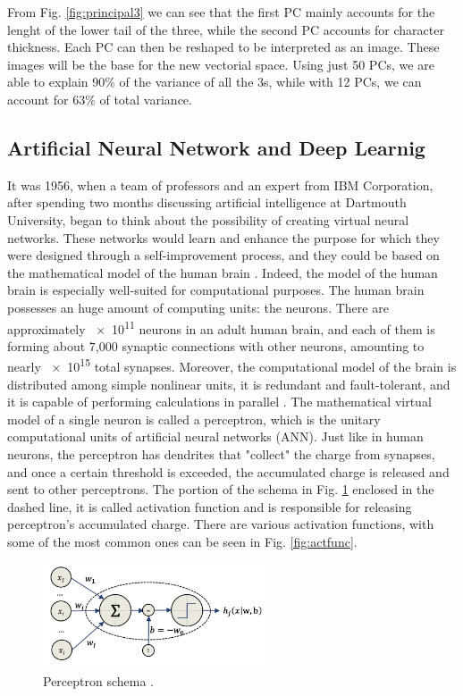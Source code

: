 From Fig. \ref{fig:principal3} we can see that the first PC mainly accounts for the lenght of the lower tail of the three, while the second PC accounts for character thickness. Each PC can then be reshaped to be interpreted as an image. These images will be the base for the new vectorial space. Using just 50 PCs, we are able to explain 90\% of the variance of all the 3s, while with 12 PCs, we can account for 63\% of total variance.



\subsection{Artificial Neural Network and Deep Learnig}
\label{subsec:deepl}
It was 1956, when a team of professors and an expert from IBM Corporation, after spending two months discussing artificial intelligence at Dartmouth University, began to think about the possibility of creating virtual neural networks. These networks would learn and enhance the purpose for which they were designed through a self-improvement process, and they could be based on the mathematical model of the human brain \cite{mccarthy_proposal_1955}. Indeed, the model of the human brain is especially well-suited for computational purposes. The human brain possesses an huge amount of computing units: the neurons. There are approximately \num{e11} neurons in an adult human brain, and each of them is forming about 7,000 synaptic connections with other neurons, amounting to nearly \num{e15} total synapses. Moreover, the computational model of the brain is distributed among simple nonlinear units, it is redundant and fault-tolerant, and it is capable of performing calculations in parallel \cite{matteo_matteucci_perceptrons_2021}. The mathematical virtual model of a single neuron is called a perceptron, which is the unitary computational units of artificial neural networks (ANN). Just like in human neurons, the perceptron has dendrites that "collect" the charge from synapses, and once a certain threshold is exceeded, the accumulated charge is released and sent to other perceptrons. The portion of the schema in Fig. \ref{fig:perceptron} enclosed in the dashed line, it is called activation function and is responsible for releasing perceptron's accumulated charge. There are various activation functions, with some of the most common ones can be seen in Fig. \ref{fig:actfunc}.
\begin{figure}
    \centering
    \includegraphics[width=0.6\textwidth]{Images/neurone.png}
    \caption[Perceptron schema]{Perceptron schema \cite{matteo_matteucci_perceptrons_2021}.}
    \label{fig:perceptron}
\end{figure}
